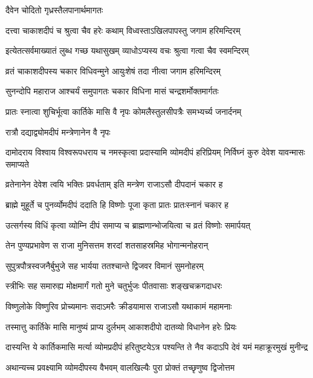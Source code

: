 \onelineshloka
{दैवेन चोदितो गृध्रस्तैलपानार्थमागतः} %

\twolineshloka
{दत्त्वा चाकाशदीपं च श्रुत्वा चैव हरेः कथाम्}
{विध्वस्ताऽखिलपापस्तु जगाम हरिमन्दिरम्} %

\twolineshloka
{इत्येतत्सर्वमाख्यातं लुब्ध गच्छ यथासुखम्}
{व्याधोऽप्यस्य वचः श्रुत्वा गत्वा चैव स्वमन्दिरम्} %

\twolineshloka
{व्रतं चाकाशदीपस्य चकार विधिवन्मुने}
{आयुःशेषं तदा नीत्वा जगाम हरिमन्दिरम्} %

\twolineshloka
{सुनन्दोपि महाराज आश्चर्यं समुपागतः}
{चकार विधिना मासं चन्द्रशर्मोक्तमार्गतः} %

\twolineshloka
{प्रातः स्नात्वा शुचिर्भूत्वा कार्तिके मासि वै नृपः}
{कोमलैस्तुलसीपत्रैः समभ्यर्च्य जनार्दनम्} %


\onelineshloka
{रात्रौ दद्याद्व्योमदीपं मन्त्रेणानेन वै नृपः} %

\threelineshloka
{दामोदराय विश्वाय विश्वरूपधराय च}
{नमस्कृत्वा प्रदास्यामि व्योमदीपं हरिप्रियम्}
{निर्विघ्नं कुरु देवेश यावन्मासः समाप्यते} %

\twolineshloka
{व्रतेनानेन देवेश त्वयि भक्तिः प्रवर्धताम्}
{इति मन्त्रेण राजाऽसौ दीपदानं चकार ह} %

\twolineshloka
{ब्राह्मे मुहूर्ते च पुनर्व्योमदीपं ददाति हि}
{विष्णोः पूजा कृता प्रातः प्रातःस्नानं चकार ह} %

\twolineshloka
{उत्सर्गस्य विधिं कृत्वा व्योम्नि दीपं समाप्य च}
{ब्राह्मणान्भोजयित्वा च व्रतं विष्णोः समार्पयत्} %

\twolineshloka
{तेन पुण्यप्रभावेण स राजा मुनिसत्तम}
{शरदां शतसाहस्रमिह भोगान्मनोहरान्} %

\twolineshloka
{सुपुत्रपौत्रस्वजनैर्बुभुजे सह भार्यया}
{ततश्चान्ते द्विजवर विमानं सुमनोहरम्} %

\twolineshloka
{स्त्रीभिः सह समारुह्य मोक्षमार्गं गतो मुने}
{चतुर्भुजः पीतवासाः शङ्खचक्रगदाधरः} %

\twolineshloka
{विष्णुलोके विष्णुरिव प्रोच्यमानः सदाऽमरैः}
{क्रीडयामास राजाऽसौ यथाकामं महामनाः} %

\twolineshloka
{तस्मात्तु कार्तिके मासि मानुष्यं प्राप्य दुर्लभम्}
{आकाशदीपो दातव्यो विधानेन हरेः प्रियः} %

\fourlineindentedshloka
{दास्यन्ति ये कार्तिकमासि मर्त्या}
{व्योमप्रदीपं हरितुष्टयेऽत्र}
{पश्यन्ति ते नैव कदाऽपि देवं}
{यमं महाक्रूरमुखं मुनीन्द्र} %

\twolineshloka
{अथान्यच्च प्रवक्ष्यामि व्योमदीपस्य वैभवम्}
{वालखिल्यैः पुरा प्रोक्तं तच्छृणुष्व द्विजोत्तम} %


